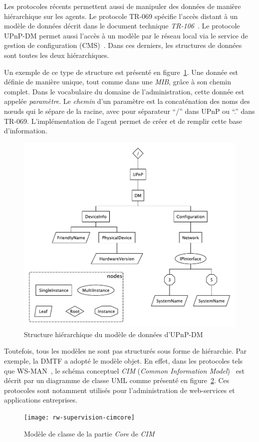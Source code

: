 Les protocoles récents permettent aussi de manipuler des données de manière hiérarchique sur les agents. Le protocole TR-069 spécifie l'accès distant à un modèle de données décrit dans le document technique \textit{TR-106}~\cite{BBF:tr106}. Le protocole UPnP-DM permet aussi l'accès à un modèle par le réseau local via le service de gestion de configuration (CMS)~\cite{UPnP:DMCMS}. Dans ces derniers, les structures de données sont toutes les deux hiérarchiques.

Un exemple de ce type de structure est présenté en figure~\ref{fig:rw:supervision:dmtree}. Une donnée est définie de manière unique, tout comme dans une \textit{MIB}, grâce à son chemin complet. Dans le vocabulaire du domaine de l'administration, cette donnée est appelée \textit{paramètre}. Le \textit{chemin} d'un paramètre est la concaténation des noms des nœuds qui le sépare de la racine, avec pour séparateur \enquote{/} dans UPnP ou \enquote{.} dans TR-069. L'implémentation de l'agent permet de créer et de remplir cette base d'information.

\begin{figure}[ht]
    \centering
    \includegraphics[width=.5\textwidth]{fig/rw-supervision-dmtree}
    \caption{Structure hiérarchique du modèle de données d'UPnP-DM}\label{fig:rw:supervision:dmtree}
\end{figure}

Toutefois, tous les modèles ne sont pas structurés sous forme de hiérarchie. Par exemple, la DMTF a adopté le modèle objet. En effet, dans les protocoles tels que WS-MAN~\cite{DMTF:WS-MAN}, le schéma conceptuel \textit{CIM} (\textit{Common Information Model})~\cite{DMTF:CIM} est décrit par un diagramme de classe UML comme présenté en figure~\ref{fig:rw:supervision:cimcore}. Ces protocoles sont notamment utilisés pour l'administration de web-services et applications entreprises. 

\begin{figure}[ht]
    \centering
    \texttt{[image: rw-supervision-cimcore]}
    \caption{Modèle de classe de la partie \textit{Core} de \textit{CIM}}\label{fig:rw:supervision:cimcore}
\end{figure}

